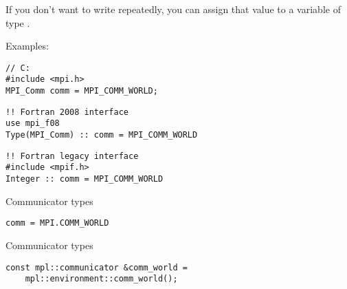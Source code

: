 If you don't want to write  repeatedly, you can
assign that value to a variable of type .

Examples:
\lstset{language=C}
\begin{lstlisting}
// C:
#include <mpi.h>
MPI_Comm comm = MPI_COMM_WORLD;
\end{lstlisting}

\lstset{language=Fortran}
\begin{lstlisting}
!! Fortran 2008 interface
use mpi_f08
Type(MPI_Comm) :: comm = MPI_COMM_WORLD
\end{lstlisting}

\begin{lstlisting}
!! Fortran legacy interface
#include <mpif.h>
Integer :: comm = MPI_COMM_WORLD
\end{lstlisting}
\lstset{language=C}

\begin{pythonnote}{Communicator types}
\lstset{language=python}
\begin{lstlisting}
comm = MPI.COMM_WORLD
\end{lstlisting}
\end{pythonnote}

\begin{mplnote}{Communicator types}
\lstset{language=C++}
\begin{lstlisting}
const mpl::communicator &comm_world =
    mpl::environment::comm_world();  
\end{lstlisting}
\end{mplnote}

